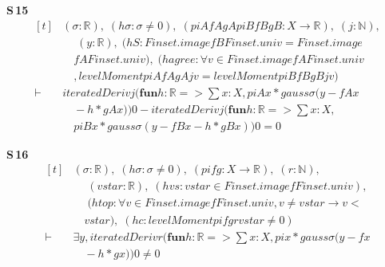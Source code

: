 \noindent\textbf{S\,15}\quad{}
{\footnotesize\[ \begin{aligned}[t]
&(\sigma : \mathbb{R} ),\; (\mathit{hσ} : \sigma \neq 0),\; (\mathit{piA} \mathit{fA} \mathit{gA} \mathit{piB} \mathit{fB} \mathit{gB} : \mathit{X} \to \mathbb{R} ),\; (\mathit{j} : \mathbb{N} ),\\
&\quad \; (\mathit{y} : \mathbb{R} ),\; (\mathit{hS} : \mathit{Finset}.\mathit{image} \mathit{fB} \mathit{Finset}.\mathit{univ} = \mathit{Finset}.\mathit{image}\\
&\quad \mathit{fA} \mathit{Finset}.\mathit{univ}),\; (\mathit{hagree} : \forall \mathit{v} \in \mathit{Finset}.\mathit{image} \mathit{fA} \mathit{Finset}.\mathit{univ}\\
&\quad , \mathit{levelMoment} \mathit{piA} \mathit{fA} \mathit{gA} \mathit{j} \mathit{v} = \mathit{levelMoment} \mathit{piB} \mathit{fB} \mathit{gB} \mathit{j} \mathit{v})\\
\vdash\;&\mathit{iteratedDeriv} \mathit{j} (\mathbf{fun} \mathit{h} : \mathbb{R} => \textstyle\sum \mathit{x} : \mathit{X}, \mathit{piA} \mathit{x} * \mathit{gauss} \sigma (\mathit{y} - \mathit{fA} \mathit{x}\\
&\quad - \mathit{h} * \mathit{gA} \mathit{x})) 0 - \mathit{iteratedDeriv} \mathit{j} (\mathbf{fun} \mathit{h} : \mathbb{R} => \textstyle\sum \mathit{x} : \mathit{X},\\
&\quad \mathit{piB} \mathit{x} * \mathit{gauss} \sigma (\mathit{y} - \mathit{fB} \mathit{x} - \mathit{h} * \mathit{gB} \mathit{x})) 0 = 0
\end{aligned} \]}

\noindent\textbf{S\,16}\quad{}
{\footnotesize\[ \begin{aligned}[t]
&(\sigma : \mathbb{R} ),\; (\mathit{hσ} : \sigma \neq 0),\; (\mathit{pi} \mathit{f} \mathit{g} : \mathit{X} \to \mathbb{R} ),\; (\mathit{r} : \mathbb{N} ),\\
&\quad \; (\mathit{vstar} : \mathbb{R} ),\; (\mathit{hvs} : \mathit{vstar} \in \mathit{Finset}.\mathit{image} \mathit{f} \mathit{Finset}.\mathit{univ}),\\
&\quad \; (\mathit{htop} : \forall \mathit{v} \in \mathit{Finset}.\mathit{image} \mathit{f} \mathit{Finset}.\mathit{univ}, \mathit{v} \neq \mathit{vstar} \to \mathit{v} <\\
&\quad \mathit{vstar}),\; (\mathit{hc} : \mathit{levelMoment} \mathit{pi} \mathit{f} \mathit{g} \mathit{r} \mathit{vstar} \neq 0)\\
\vdash\;&\exists \mathit{y}, \mathit{iteratedDeriv} \mathit{r} (\mathbf{fun} \mathit{h} : \mathbb{R} => \textstyle\sum \mathit{x} : \mathit{X}, \mathit{pi} \mathit{x} * \mathit{gauss} \sigma (\mathit{y} - \mathit{f} \mathit{x}\\
&\quad - \mathit{h} * \mathit{g} \mathit{x})) 0 \neq 0
\end{aligned} \]}


